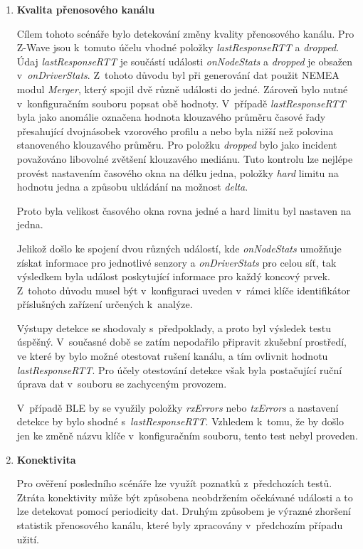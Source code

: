 \begin{enumerate} [label=\textbf{S.\arabic*}]
    Výsledek detekce splnil očekávání a nepovolené změny byly úspěšně detekovány. Chování 
    jednotlivých položek profilu se shodovalo s~předchozím scénářem.
    
    \item \textbf{Kvalita přenosového kanálu}
    
    Cílem tohoto scénáře bylo detekování změny kvality přenosového kanálu. Pro Z-Wave jsou 
    k~tomuto účelu vhodné položky \textit{lastResponseRTT} a \textit{dropped}. Údaj
    \textit{lastResponseRTT} je součástí události \textit{onNodeStats} a 
    \textit{dropped} je obsažen v~\textit{onDriverStats}. Z~tohoto důvodu byl při generování dat použit
    NEMEA modul \textit{Merger}, který spojil dvě různě události do jedné. Zároveň bylo nutné
    v~konfiguračním souboru
     popsat obě hodnoty. V~případě \textit{lastResponseRTT} byla jako anomálie označena
    hodnota klouzavého průměru časové řady přesahující dvojnásobek vzorového profilu a nebo byla nižší
    než polovina stanoveného klouzavého průměru. Pro položku \textit{dropped} bylo jako incident považováno
    libovolné zvětšení klouzavého mediánu. Tuto kontrolu lze nejlépe provést nastavením časového okna
    na délku jedna, položky \textit{hard} limitu na hodnotu jedna a způsobu ukládání
    na možnost \textit{delta}.
    
    Proto byla velikost časového okna rovna jedné a hard limitu byl
    nastaven na jedna. 
    
    Jelikož došlo ke spojení dvou různých událostí, kde \textit{onNodeStats}
    umožňuje získat informace pro jednotlivé senzory a \textit{onDriverStats} pro celou síť, 
    tak výsledkem byla událost poskytující informace pro každý koncový prvek. Z~tohoto důvodu 
    musel být v~konfiguraci uveden v~rámci klíče identifikátor příslušných zařízení určených k~analýze.
    
    Výstupy detekce se shodovaly s~předpoklady, a proto byl výsledek testu úspěšný. V~současné
    době se zatím nepodařilo připravit zkušební prostředí, ve které by bylo možné otestovat
    rušení kanálu, a tím ovlivnit hodnotu \textit{lastResponseRTT}. Pro účely otestování 
    detekce však byla postačující ruční úprava dat v~souboru se zachyceným provozem. 
    
    V~případě BLE by se využily položky \textit{rxErrors} nebo \textit{txErrors} a nastavení 
    detekce by bylo shodné s~\textit{lastResponseRTT}. Vzhledem k~tomu, že by došlo jen 
    ke změně názvu klíče v~konfiguračním souboru, tento test nebyl proveden.
    
    \item \textbf{Konektivita}
    
    Pro ověření posledního scénáře lze využít poznatků z~předchozích testů. Ztráta konektivity
    může být způsobena neobdržením očekávané události a to lze detekovat pomocí periodicity dat.
    Druhým způsobem je výrazné zhoršení statistik přenosového kanálu, které byly zpracovány
    v~předchozím případu užití.
  \end{enumerate}
  
